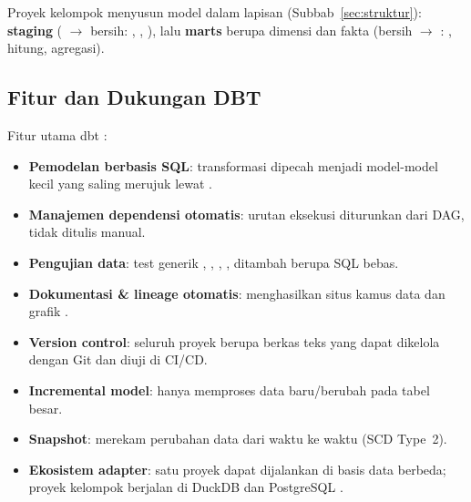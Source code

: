 Proyek kelompok menyusun model dalam lapisan (Subbab~\ref{sec:struktur}): \textbf{staging} ( $\rightarrow$ bersih: , , ), lalu \textbf{marts} berupa dimensi dan fakta (bersih $\rightarrow$ : , hitung, agregasi).

\subsection{Fitur dan Dukungan DBT}
Fitur utama dbt \citep{dbtdocs,shamimw}:
\begin{itemize}[nosep]
    \item \textbf{Pemodelan berbasis SQL}: transformasi dipecah menjadi model-model kecil yang saling merujuk lewat .
    \item \textbf{Manajemen dependensi otomatis}: urutan eksekusi diturunkan dari DAG, tidak ditulis manual.
    \item \textbf{Pengujian data}: test generik , , , , ditambah  berupa SQL bebas.
    \item \textbf{Dokumentasi \& lineage otomatis}:  menghasilkan situs kamus data dan grafik .
    \item \textbf{Version control}: seluruh proyek berupa berkas teks yang dapat dikelola dengan Git dan diuji di CI/CD.
    \item \textbf{Incremental model}: hanya memproses data baru/berubah pada tabel besar.
    \item \textbf{Snapshot}: merekam perubahan data dari waktu ke waktu (SCD Type~2).
    \item \textbf{Ekosistem adapter}: satu proyek dapat dijalankan di basis data berbeda; proyek kelompok berjalan di DuckDB dan PostgreSQL \citep{dbtduckdb,dbtpostgres}.
\end{itemize}

